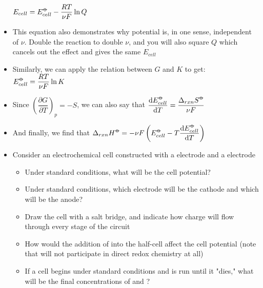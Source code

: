 \documentclass[12pt, openany, letterpaper]{memoir}
\begin{document}
\begin{itemize}
	      $E_{cell}=E_{cell}^{\std}-\dfrac{RT}{\nu F}\ln Q$
	\item This equation also demonstrates why potential is, in one sense, independent of $\nu$. Double the reaction to double $\nu$, and you will also square $Q$ which cancels out the effect and gives the same $E_{cell}$
	\item Similarly, we can apply the relation between $G$ and $K$ to get: $E_{cell}^{\std}=\dfrac{RT}{\nu F}\ln K$
	\item Since $\left(\dfrac{\partial G}{\partial T}\right)_p=-S$, we can also say that $\dfrac{\mathrm{d}E_{cell}^{\std}}{\mathrm{d}T} = \dfrac{\Delta_{rxn}S^{\std}}{\nu F}$
	\item And finally, we find that $\Delta_{rxn} H^{\std} = -\nu F\left(E_{cell}^{\std}-T\dfrac{\mathrm{d}E_{cell}^{\std}}{\mathrm{d}T}\right)$
	\item Consider an electrochemical cell constructed with a  electrode and a   electrode
	      \begin{itemize}
		      \item Under standard conditions, what will be the cell potential?
		      \item Under standard conditions, which electrode will be the cathode and which will be the anode?
		      \item Draw the cell with a salt bridge, and indicate how charge will flow through every stage of the circuit
		      \item How would the addition of  into the  half-cell affect the cell potential (note that  will not participate in direct redox chemistry at all)
		      \item If a cell begins under standard conditions and is run until it "dies," what will be the final concentrations of  and ?
	      \end{itemize}
\end{itemize}
\end{document}
